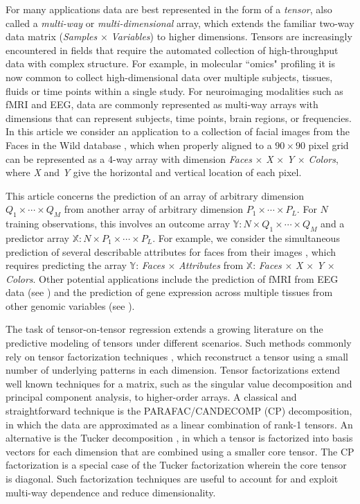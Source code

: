 \documentclass[12pt]{article}
\def\ctimes{\times \cdots \times}
\def\XX{\mathbb{X}}
\def\YY{\mathbb{Y}}
\begin{document}
For many applications data are best represented in the form of a \emph{tensor}, also called a \emph{multi-way} or \emph{multi-dimensional} array, which extends the familiar two-way data matrix (\emph{Samples} $\times$ \emph{Variables}) to higher dimensions.   Tensors are increasingly encountered in fields that require the automated collection of high-throughput data with complex structure.  For example, in molecular ``omics"  profiling it is now common to collect high-dimensional data over multiple subjects, tissues, fluids or time points within a single study.  For neuroimaging modalities such as fMRI and EEG, data are commonly represented as multi-way arrays with dimensions that can represent subjects, time points, brain regions, or frequencies.  In this article we consider an application to a collection of facial images from the Faces in the Wild database \citep{learned2016labeled}, which when properly aligned to a $90 \times 90$ pixel grid can be represented as a 4-way array with dimension \emph{Faces} $\times$ \emph{X} $\times$ \emph{Y} $\times$ \emph{Colors}, where \emph{X} and \emph{Y} give the horizontal and vertical location of each pixel.     

This article concerns the prediction of an array of arbitrary dimension $Q_1 \ctimes Q_M$ from another array of arbitrary dimension $P_1 \ctimes P_L$.  For $N$ training observations, this involves an outcome array $\YY: N \times Q_1 \ctimes Q_M$ and a predictor array $\XX: N \times P_1 \ctimes P_L$.  For example, we consider the simultaneous prediction of several describable  attributes for faces from their images \citep{kumar2009attribute}, which requires predicting the array $\YY$: \emph{Faces} $\times$ \emph{Attributes} from $\XX$: \emph{Faces} $\times$ \emph{X} $\times$ \emph{Y} $\times$ \emph{Colors}.  Other potential applications include the prediction of fMRI from EEG data (see \citet{de2011predicting}) and the prediction of gene expression across multiple tissues from other genomic variables (see \cite{ramasamy2014genetic}).   

The task of tensor-on-tensor regression extends a growing literature on the predictive modeling of tensors under different scenarios.  Such methods commonly rely on tensor factorization techniques \citep{kolda2009tensor}, which reconstruct a tensor using a small number of underlying patterns in each dimension.  Tensor factorizations extend well known techniques for a matrix, such as the singular value decomposition and principal component analysis,  to higher-order arrays.   A classical and straightforward technique is the PARAFAC/CANDECOMP (CP) \citep{harshman1970foundations} decomposition, in which the data are approximated as a linear combination of rank-1 tensors.  An alternative is the Tucker  decomposition \citep{tucker1966some}, in which a tensor is factorized into basis vectors for each dimension that are combined using a smaller core tensor.  The CP factorization is a special case of the Tucker factorization wherein the core tensor is diagonal.  Such factorization techniques are useful to account for and exploit multi-way dependence and reduce dimensionality.  
\end{document}
